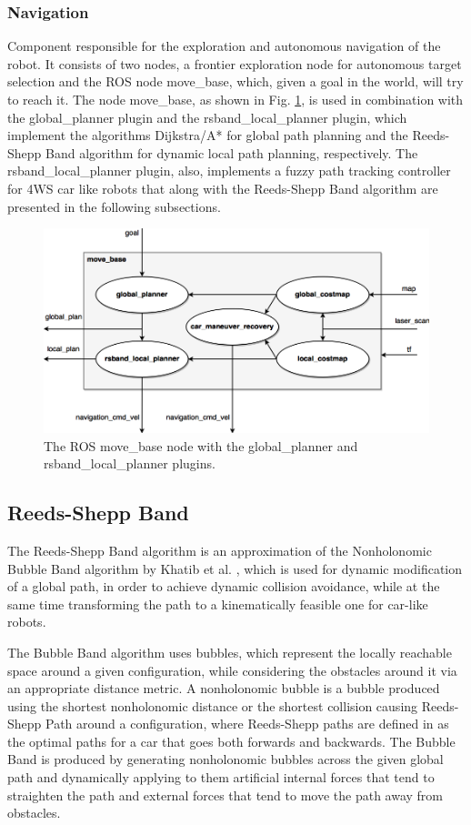 \documentclass[conference]{IEEEtran}
\begin{document}
\subsubsection{Navigation}
Component responsible for the exploration and autonomous navigation of the robot. It consists of two nodes, a frontier exploration node for autonomous target selection and the ROS node move\_base, which, given a goal in the world, will try to reach it. The node move\_base, as shown in Fig. \ref{fig:move_base}, is used in combination with the global\_planner plugin and the rsband\_local\_planner plugin, which implement the algorithms Dijkstra/A* for global path planning and the Reeds-Shepp Band algorithm for dynamic local path planning, respectively. The rsband\_local\_planner plugin, also, implements a fuzzy path tracking controller for 4WS car like robots that along with the Reeds-Shepp Band algorithm are presented in the following subsections.

\begin{figure}[!ht]
	\centering
	\includegraphics[width=0.9\linewidth]{Figures/move_base2.png}%
	\caption{The ROS move\_base node with the global\_planner and rsband\_local\_planner plugins.}
	\label{fig:move_base}
\end{figure}

\subsection{Reeds-Shepp Band}
The Reeds-Shepp Band algorithm is an approximation of the Nonholonomic Bubble Band algorithm by Khatib et al. \cite{dpm}, which is used for dynamic modification of a global path, in order to achieve dynamic collision avoidance, while at the same time transforming the path to a kinematically feasible one for car-like robots.

The Bubble Band algorithm uses bubbles, which represent the locally reachable space around a given configuration, while considering the obstacles around it via an appropriate distance metric. A nonholonomic bubble is a bubble produced using the shortest nonholonomic distance \cite{rs_metric} or the shortest collision causing Reeds-Shepp Path around a configuration, where Reeds-Shepp paths are defined in \cite{reeds_shepp} as the optimal paths for a car that goes both forwards and backwards. The Bubble Band is produced by generating nonholonomic bubbles across the given global path and dynamically applying to them artificial internal forces that tend to straighten the path and external forces that tend to move the path away from obstacles.
\end{document}
